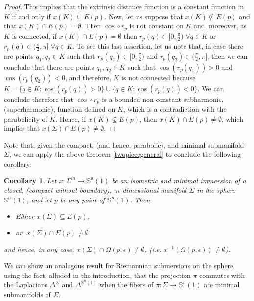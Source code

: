 \documentclass[11pt,letterpaper]{amsart}
\newtheorem{corollary}[theorem]{Corollary}
\theoremstyle{definition}
\theoremstyle{remark}
\newcommand{\ese}{\mathbb{S}}
\begin{document}
\begin{proof}
This implies that the extrinsic distance function is a constant function in $K$ if and only if $x(K)\subseteq E(p)$.
Now,  let us suppose that $x(K) \not\subseteq E(p)$ and that $x(K)\cap  E(p)=\emptyset$. Then $\cos\circ r_p$ is not constant on $K$ and, moreover, as $K$ is connected,  if $x(K)\cap  E(p)=\emptyset$ then $r_p(q) \in [0,\frac{\pi}{2})\,\,\forall q \in K$ or $r_p(q) \in (\frac{\pi}{2},\pi]\,\,\forall q \in K$. To see this last assertion, let us note that, in case there are points $q_1, q_2 \in K$ such that $r_p(q_1) \in [0,\frac{\pi}{2})$ and  $r_p(q_2) \in (\frac{\pi}{2},\pi]$, then we can conclude that there are points $q_1, q_2 \in K$ such that $\cos(r_p(q_1)) >0$ and  $\cos (r_p(q_2)) <0$, and therefore, $K$ is not connected because $K=\{ q \in K: \cos(r_p(q)) >0\}\cup \{ q \in K: \cos(r_p(q))< 0\} $. We can conclude therefore that $\cos\circ r_p$ is a bounded non-constant subharmonic, (superharmonic), function defined on $K$, which is a contradiction with the parabolicity of $K$. Hence, if  $x(K) \not\subseteq E(p)$, then $x(K)\cap  E(p)\neq \emptyset$, which implies that $x(\Sigma)\cap  E(p)\neq \emptyset$.\end{proof}
Note that, given the compact, (and hence, parabolic), and minimal submanifold $\Sigma$, we can apply  the above theorem \ref{twopiecegeneral} to conclude the following corollary:
\begin{corollary}\label{cortwo}
	Let  $x: \Sigma^m \to \mathbb{S}^n(1)$ be an isometric and minimal immersion of a closed, (compact without boundary), $m$-dimensional manifold $\Sigma$ in the sphere  $\mathbb{S}^n(1)$, and let $p$ be any point of $\mathbb{S}^n(1)$.  Then
    \begin{itemize}
        \item Either $x(\Sigma)\subseteq E(p)$, 
        \item or, $x(\Sigma)\cap E(p)\neq \emptyset$
            \end{itemize}
            and  hence, in any case,  $x(\Sigma) \cap \Omega(p,\epsilon) \neq \emptyset$, (i.e. $x^{-1}(\Omega(p,\epsilon))\neq \emptyset$).
\end{corollary}

We can show an analogous result for Riemannian submersions on the sphere, using the fact, alluded in the introduction, that the projection $\pi$ commutes with the Laplacians $\Delta^\Sigma$ and $\Delta^{\ese^n(1)}$ when the fibers of $\pi: \Sigma \rightarrow \ese^n(1)$ are minimal submanifolds of $\Sigma$.
\end{document}

